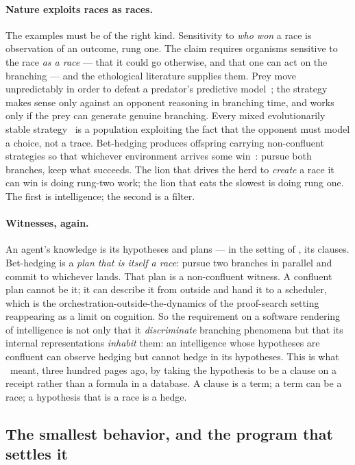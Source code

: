 \paragraph{Nature exploits races as races.}
The examples must be of the right kind.
Sensitivity to \emph{who won} a race is observation of an outcome, rung
one.
The claim requires organisms sensitive to the race \emph{as a race} ---
that it could go otherwise, and that one can act on the branching ---
and the ethological literature supplies them.
Prey move unpredictably in order to defeat a predator's predictive
model~\cite{HumphriesDriver70}; the strategy makes sense only against an
opponent reasoning in branching time, and works only if the prey can
generate genuine branching.
Every mixed evolutionarily stable strategy~\cite{MaynardSmith82} is a
population exploiting the fact that the opponent must model a choice,
not a trace.
Bet-hedging produces offspring carrying non-confluent strategies so that
whichever environment arrives some win~\cite{SegerBrockmann87}: pursue
both branches, keep what succeeds.
The lion that drives the herd to \emph{create} a race it can win is doing
rung-two work; the lion that eats the slowest is doing rung one.
The first is intelligence; the second is a filter.

\paragraph{Witnesses, again.}
An agent's knowledge is its hypotheses and plans --- in the setting of
\chSci, its clauses.
Bet-hedging is a \emph{plan that is itself a race}: pursue two branches
in parallel and commit to whichever lands.
That plan is a non-confluent witness.
A confluent plan cannot be it; it can describe it from outside and hand
it to a scheduler, which is the orchestration-outside-the-dynamics of
the proof-search setting reappearing as a limit on cognition.
So the requirement on a software rendering of intelligence is not only
that it \emph{discriminate} branching phenomena but that its internal
representations \emph{inhabit} them: an intelligence whose hypotheses
are confluent can observe hedging but cannot hedge in its hypotheses.
This is what \chSci\ meant, three hundred pages ago, by taking the
hypothesis to be a clause on a receipt rather than a formula in a
database.
A clause is a term; a term can be a race; a hypothesis that is a race is
a hedge.

\subsection{The smallest behavior, and the program that settles it}
\label{inh:sec:smallest}

